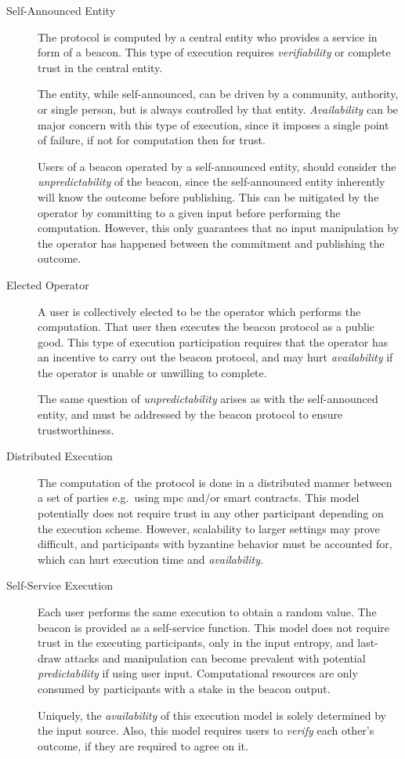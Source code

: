 \begin{description}
    \item[Self-Announced Entity]
        The protocol is computed by a central entity who provides a service in form of a beacon.
        This type of execution requires \emph{verifiability} or complete trust in the central entity.

        The entity, while self-announced, can be driven by a community, authority, or single person, but is always controlled by that entity.
        \emph{Availability} can be major concern with this type of execution, since it imposes a single point of failure, if not for computation then for trust.

        Users of a beacon operated by a self-announced entity, should consider the \emph{unpredictability} of the beacon, since the self-announced entity inherently will know the outcome before publishing.
        This can be mitigated by the operator by committing to a given input before performing the computation.
        However, this only guarantees that no input manipulation by the operator has happened between the commitment and publishing the outcome.

    \item[Elected Operator]
        A user is collectively elected to be the operator which performs the computation.
        That user then executes the beacon protocol as a public good.
        This type of execution participation requires that the operator has an incentive to carry out the beacon protocol, and may hurt \emph{availability} if the operator is unable or unwilling to complete.

        The same question of \emph{unpredictability} arises as with the self-announced entity, and must be addressed by the beacon protocol to ensure trustworthiness.

    \item[Distributed Execution]
        The computation of the protocol is done in a distributed manner between a set of parties e.g.\ using \gls{mpc} and/or smart contracts.
        This model potentially does not require trust in any other participant depending on the execution scheme.
        However, scalability to larger settings may prove difficult, and participants with byzantine behavior must be accounted for, which can hurt execution time and \emph{availability}.

    \item[Self-Service Execution]
        Each user performs the same execution to obtain a random value. The beacon is provided as a self-service function.
        This model does not require trust in the executing participants, only in the input entropy, and last-draw attacks and manipulation can become prevalent with potential \emph{predictability} if using user input.
        Computational resources are only consumed by participants with a stake in the beacon output.

        Uniquely, the \emph{availability} of this execution model is solely determined by the input source.
        Also, this model requires users to \emph{verify} each other's outcome, if they are required to agree on it.

\end{description}

